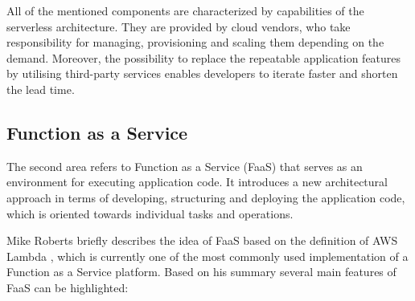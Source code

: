 All of the mentioned components are characterized by capabilities of the serverless architecture. They are provided by cloud vendors, who take responsibility for managing, provisioning and scaling them depending on the demand. Moreover, the possibility to replace the repeatable application features by utilising third-party services enables developers to iterate faster and shorten the lead time.

\subsection{Function as a Service}

The second area refers to Function as a Service (FaaS) that serves as an environment for executing application code. It introduces a new architectural approach in terms of developing, structuring and deploying the application code, which is oriented towards individual tasks and operations.

Mike Roberts briefly describes the idea of FaaS \cite{MartinFowlerServerless} based on the definition of AWS Lambda \cite{AWSLambda}, which is currently one of the most commonly used implementation of a Function as a Service platform. Based on his summary several main features of FaaS can be highlighted:


